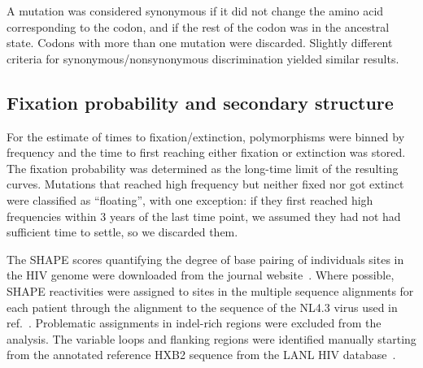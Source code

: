\documentclass[rmp, twocolumn]{revtex4}
\begin{document}
A mutation was considered synonymous if it did not change the amino acid
corresponding to the codon, and if the rest of the codon was in the ancestral
state. Codons with more than one mutation were discarded. Slightly different
criteria for synonymous/nonsynonymous discrimination yielded similar results.

\subsection{Fixation probability and secondary structure}
For the estimate of times to fixation/extinction, polymorphisms were
binned by frequency and the time to first reaching either fixation or
extinction was stored. The fixation probability was determined as the long-time
limit of the resulting curves. Mutations that reached high frequency but neither
fixed nor got extinct were classified as ``floating'', with one exception: if they first
reached high frequencies within 3 years of the last time point, we assumed
they had not had sufficient time to settle, so we discarded them.


The SHAPE scores quantifying the degree of base pairing of individuals sites in
the HIV genome were downloaded from the journal
website~\citep{watts_architecture_2009}.
Where possible, SHAPE reactivities were assigned to sites in the multiple
sequence alignments for each patient through the alignment to the sequence
of the NL4.3 virus used in ref.~\citep{watts_architecture_2009}. Problematic
assignments in indel-rich regions were excluded from the analysis.
The variable loops and flanking regions were identified manually starting from
the annotated reference HXB2 sequence from the LANL HIV database~\citep{LANL2012}. 

\end{document}
